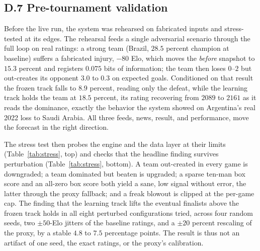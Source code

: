 \documentclass[11pt,letterpaper]{article}
\begin{document}
\subsection*{D.7 \quad Pre-tournament validation}

Before the live run, the system was rehearsed on fabricated inputs and stress-tested at its edges. The rehearsal feeds a single adversarial scenario through the full loop on real ratings: a strong team (Brazil, $28.5$ percent champion at baseline) suffers a fabricated injury, $-80$ Elo, which moves the \emph{before} snapshot to $15.3$ percent and registers $0.075$ bits of information; the team then loses $0$--$2$ but out-creates its opponent $3.0$ to $0.3$ on expected goals. Conditioned on that result the frozen track falls to $8.9$ percent, reading only the defeat, while the learning track holds the team at $18.5$ percent, its rating recovering from $2089$ to $2161$ as it reads the dominance, exactly the behavior the system showed on Argentina's real 2022 loss to Saudi Arabia. All three feeds, news, result, and performance, move the forecast in the right direction.

The stress test then probes the engine and the data layer at their limits (Table~\ref{tab:stress}, top) and checks that the headline finding survives perturbation (Table~\ref{tab:stress}, bottom). A team out-created in every game is downgraded; a team dominated but beaten is upgraded; a sparse ten-man box score and an all-zero box score both yield a sane, low signal without error, the latter through the proxy fallback; and a freak blowout is clipped at the per-game cap. The finding that the learning track lifts the eventual finalists above the frozen track holds in all eight perturbed configurations tried, across four random seeds, two $\pm 50$-Elo jitters of the baseline ratings, and a $\pm 20$ percent rescaling of the proxy, by a stable $4.8$ to $7.5$ percentage points. The result is thus not an artifact of one seed, the exact ratings, or the proxy's calibration.
\end{document}
